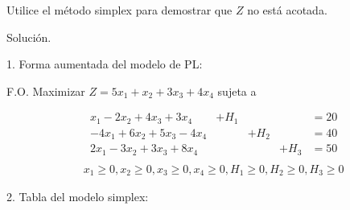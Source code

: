\documentclass[fleqn, 12pt]{article}
\begin{document}
\begin{enumerate}
		Utilice el método simplex para demostrar que $ Z $ no está acotada.

		Solución.

		1. Forma aumentada del modelo de PL:

		F.O. Maximizar $ Z = 5 x_1 + x_2 + 3 x_3 + 4 x_4 $ sujeta a

		\begin{align*}
			& x_1    - 2 x_2 + 4 x_3 + 3 x_4 & + H_1 &       &       & = 20 \\
			& -4 x_1 + 6 x_2 + 5 x_3 - 4 x_4 &       & + H_2 &       & = 40 \\
			& 2 x_1  - 3 x_2 + 3 x_3 + 8 x_4 &       &       & + H_3 & = 50 \\
		\end{align*}
		\begin{align*}
			& x_1 \geq 0, x_2 \geq 0, x_3 \geq 0, x_4 \geq 0, H_1 \geq 0, H_2 \geq 0, H_3 \geq 0
		\end{align*}

		2. Tabla del modelo simplex:


\end{enumerate}
\end{document}
